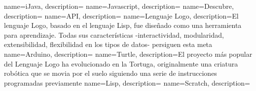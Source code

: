 
%





{
        name=iJava,
        description={}
}
{
        name=Javascript,
        description={}
}
{
        name=Descubre,
        description={}
}
{
        name=API,
        description={}
}
{
        name=Lenguaje Logo,
        description={El lenguaje Logo, basado en el lenguaje Lisp, fue diseñado como una herramienta para aprendizaje. Todas sus características -interactividad, modularidad, extensibilidad, flexibilidad en los tipos de datos- persiguen esta meta}
}
{
        name=Arduino,
        description={}
}
{
        name=Turtle,
        description={El proyecto más popular del Lenguaje Logo ha evolucionado en la Tortuga, originalmente una criatura robótica que se movia por el suelo siguiendo una serie de instrucciones programadas previamente}
}
{
        name=Lisp,
        description={}
}
{
        name=Scratch,
        description={}
}
